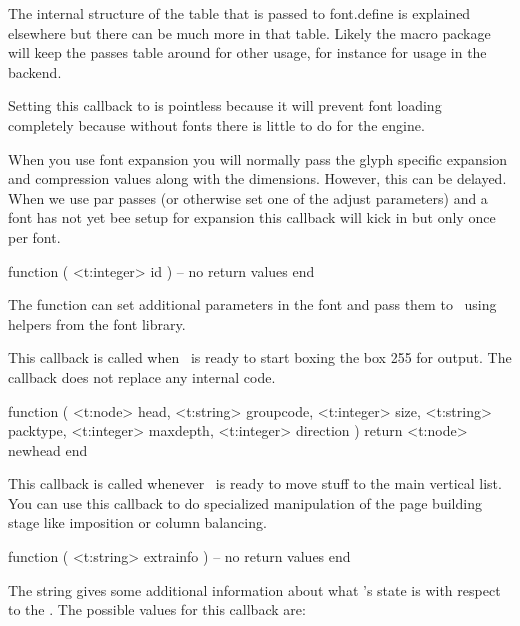 The internal structure of the  table that is passed to \type
{font.define} is explained elsewhere but there can be much more in that table.
Likely the macro package will keep the passes table around for other usage, for
instance for usage in the backend.

Setting this callback to  is pointless because it will prevent font
loading completely because without fonts there is little to do for the engine.

\stopsubsection

\startsubsection[title=quality_font]

When you use font expansion you will normally pass the glyph specific expansion and
compression values along with the dimensions. However, this can be delayed. When we
use par passes (or otherwise set one of the adjust parameters) and a font has not
yet bee setup for expansion this callback will kick in but only once per font.

\starttyping[option=LUA]
function (
    <t:integer> id
)
    -- no return values
end
\stoptyping

The function can set additional parameters in the font and pass them to \TEX\ using
helpers from the font library.

\stopsubsection

\stopsection

\startsection[title=Typesetting]

\startsubsection[title=pre_output_filter]

This callback is called when \TEX\ is ready to start boxing the box 255 for \prm
{output}. The callback does not replace any internal code.

\starttyping[option=LUA]
function (
    <t:node>    head,
    <t:string>  groupcode,
    <t:integer> size,
    <t:string>  packtype,
    <t:integer> maxdepth,
    <t:integer> direction
)
    return <t:node> newhead
end
\stoptyping

\stopsubsection

\startsubsection[title=buildpage_filter]

This callback is called whenever \LUAMETATEX\ is ready to move stuff to the main
vertical list. You can use this callback to do specialized manipulation of the
page building stage like imposition or column balancing.

\starttyping[option=LUA]
function (
    <t:string> extrainfo
)
    -- no return values
end
\stoptyping

The string  gives some additional information about what \TEX's
state is with respect to the . The possible values for this
callback are:

